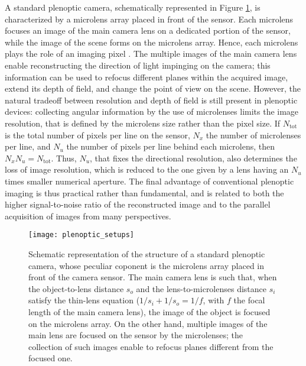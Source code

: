 \documentclass[aps,pra,amssymb,twocolumn,amsmath,superscriptaddress,showpacs,10pt]{revtex4-1}
\begin{document}
A standard plenoptic camera, schematically represented in Figure \ref{fig:plenoptic}, is characterized by a microlens array placed in front of the sensor. Each microlens focuses an image of the main camera lens on a dedicated portion of the sensor, while the image of the scene forms on the microlens array. Hence, each microlens plays the role of an imaging pixel \cite{adelson, ng}. The multiple images of the main camera lens enable reconstructing the direction of light impinging on the camera; this information can be used to refocus different planes within the acquired image, extend its depth of field, and change the point of view on the scene. However, the natural tradeoff between resolution and depth of field is still present in plenoptic devices: collecting angular information by the use of microlenses limits the image resolution, that is defined by the microlens size rather than the pixel size. If $N_{\mathrm{tot}}$ is the total number of pixels per line on the sensor, $N_x$ the number of microlenses per line, and $N_u$ the number of pixels per line behind each microlens, then $N_x N_u = N_{\mathrm{tot}}$. Thus, $N_u$, that fixes the directional resolution, also determines the loss of image resolution, which is reduced to the one given by a lens having an $N_u$ times smaller numerical aperture. The final advantage of conventional plenoptic imaging is thus practical rather than fundamental, and is related to both the higher signal-to-noise ratio of the reconstructed image and to the parallel acquisition of images from many perspectives.

\begin{figure}
\centering
\texttt{[image: plenoptic\_setups]}
\caption{Schematic representation of the structure of a standard plenoptic camera, whose peculiar coponent is the microlens array placed in front of the camera sensor. The main camera lens is such that, when the object-to-lens distance $s_o$ and the lens-to-microlenses distance $s_i$ satisfy the thin-lens equation ($1/s_i+1/s_o=1/f$, with $f$ the focal length of the main camera lens), the image of the object is focused on the microlens array. On the other hand, multiple images of the main lens are focused on the sensor by the microlenses;  the collection of such images enable to refocus planes different from the focused one.}\label{fig:plenoptic}
\end{figure}
\end{document}
